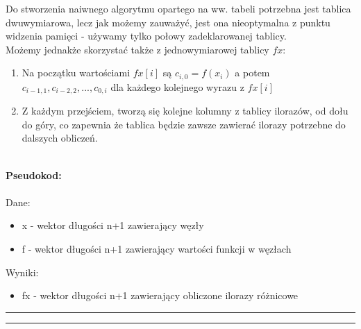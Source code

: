 \documentclass{article}
\begin{document}
Do stworzenia naiwnego algorytmu opartego na ww. tabeli potrzebna jest tablica dwuwymiarowa, lecz jak możemy zauważyć, jest ona nieoptymalna z punktu widzenia pamięci - używamy tylko połowy zadeklarowanej tablicy.\\
Możemy jednakże skorzystać także z jednowymiarowej tablicy $fx$:
\begin{enumerate}
	\item Na początku wartościami $fx[i]$ są $c_{i,0}=f(x_i)$ a potem $c_{i-1,1},c_{i-2,2},...,c_{0,i}$ dla każdego kolejnego wyrazu z $fx[i]$
	\item Z każdym przejściem, tworzą się kolejne kolumny z tablicy ilorazów, od dołu do góry, co zapewnia że tablica będzie zawsze zawierać ilorazy potrzebne do dalszych obliczeń.\\\\
\end{enumerate}
\noindent \textbf{Pseudokod: } \\\\
Dane:
\begin{itemize}
	\item x - wektor długości n+1 zawierający węzły
	\item f - wektor długości n+1 zawierający wartości funkcji w węzłach
\end{itemize}
Wyniki:
\begin{itemize}
	\item fx - wektor długości n+1 zawierający obliczone ilorazy różnicowe
\end{itemize}
\rule{\textwidth}{0.4pt}
\begin{algorithm}[H]
	\vspace{0.3cm}
\end{algorithm}
\hrule
\vspace{0.3cm}
\end{document}
